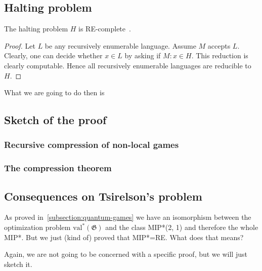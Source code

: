
\subsection{Halting problem}

\begin{theorem}
    The halting problem $H$ is RE-complete~\cite{Algorithms}.
\begin{proof}
    Let $L$ be any recursively enumerable language. Assume $M$ accepts $L$. Clearly, one can decide whether $x \in L$ by asking if $M: x \in H$. This reduction is clearly computable. Hence all recursively enumerable languages are reducible to $H$.
\end{proof}
\end{theorem}

What we are going to do then is 
\subsection{Sketch of the proof}
\subsubsection{Recursive compression of non-local games}
\subsubsection{The compression theorem}

\subsection{Consequences on Tsirelson's problem}
As proved in~\ref{subsection:quantum-games} we have an isomorphism between the optimization problem $\operatorname{val^{*}}(\mathfrak{G})$ and the class MIP*(2, 1) and therefore the whole MIP*. But we just (kind of) proved that MIP*=RE.
What does that means?

Again, we are not going to be concerned with a specific proof, but we will just sketch it.


